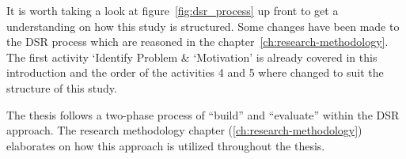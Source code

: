 It is worth taking a look at figure~\ref{fig:dsr_process} up front to get a understanding on how this study is
structured.
Some changes have been made to the DSR process which are reasoned in the chapter~\ref{ch:research-methodology}.
The first activity `Identify Problem \& `Motivation' is already covered in this introduction and the order of the
activities 4 and 5 where changed to suit the structure of this study.

The thesis follows a two-phase process of ``build'' and ``evaluate'' within the DSR approach.
The research methodology chapter (\ref{ch:research-methodology}) elaborates on how this approach is
utilized throughout the thesis.

